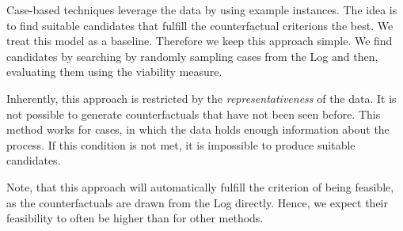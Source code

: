 \documentclass[./../../paper.tex]{subfiles}
\begin{document}
Case-based techniques leverage the data by using example instances. The idea is to find suitable candidates that fulfill the counterfactual criterions the best. We treat this model as a baseline. Therefore we keep this approach simple. We find candidates by searching by randomly sampling cases from the Log and then, evaluating them using the viability measure.

Inherently, this approach is restricted by the \emph{representativeness} of the data. It is not possible to generate counterfactuals that have not been seen before. This method works for cases, in which the data holds enough information about the process. If this condition is not met, it is impossible to produce suitable candidates.

Note, that this approach will automatically fulfill the criterion of being feasible, as the counterfactuals are drawn from the Log directly. Hence, we expect their feasibility to often be higher than for other methods.
\end{document}
